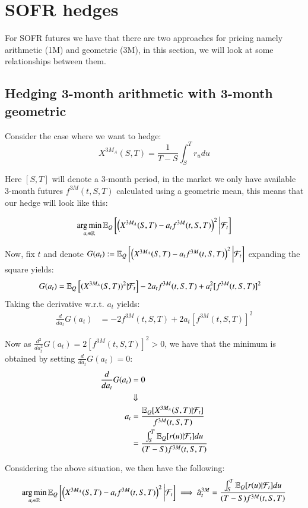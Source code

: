 \newpage 

\section{SOFR hedges}
For SOFR futures we have that there are two approaches for pricing namely arithmetic (1M) and geometric (3M), in this section, we will look at some relationships between them.


\subsection{Hedging 3-month arithmetic with 3-month geometric}
Consider the case where we want to hedge: 
$$
X^{3M_{A}}(S,T) = \frac{1}{T-S}\int_{S}^{T}r_{u}du
$$

Here $[S,T]$ will denote a 3-month period, in the market we only have available
3-month futures $f^{3M}(t,S,T)$  calculated using a geometric mean, this means that our hedge will look like this:

\begin{align*}
\operatorname*{arg\,min}\limits_{a_{t} \in \mathbb{R}}\mathbb{E}_{Q}\left[
\left(
X^{3M_{A}}(S,T)-a_{t}f^{3M}(t,S,T)
\right)^{2}
\bigg{|}\mathcal{F}_{t}
\right]
\end{align*}

Now, fix $t$ and denote
 $G(a_{t}) :=\mathbb{E}_{Q}\left[
\left(X^{3M_{A}}(S,T)-a_{t}f^{3M}(t,S,T)
\right)^{2}
\bigg{|}\mathcal{F}_{t}
\right]
$ 
expanding the square yields:
\begin{align*}
G(a_{t}) &= \mathbb{E}_{Q}\left[(X^{3M_{A}}(S,T))^{2}|\mathcal{F}_{t}\right] -2a_{t}f^{3M}(t,S,T) +
a_{t}^{2}[f^{3M}(t,S,T)]^{2}
\end{align*}
Taking the derivative w.r.t. $a_{t}$ yields: 
\begin{align*}
\frac{d}{da_{t}}G(a_{t}) &= -2f^{3M}(t,S,T) + 2a_{t}[f^{3M}(t,S,T)]^{2}  
\end{align*} 

Now as $\frac{d^{2}}{da_{t}^{2}}G(a_{t}) = 2[f^{3M}(t,S,T)]^{2} > 0$, we have that the minimum is obtained by setting $\frac{d}{da_{t}}G(a_{t}) = 0$:
\begin{align*}
\frac{d}{da_{t}}G(a_{t}) &= 0 \\ 
&\Downarrow \\ 
a_{t} &= \frac{
\mathbb{E}_{Q}[X^{3M_{A}}(S,T)|\mathcal{F}_{t}]
}{
f^{3M}(t,S,T)
} \\ 
&= \frac{
\int_{S}^{T}\mathbb{E}_{Q}[r(u)|\mathcal{F}_{t}]du
}{
(T-S)f^{3M}(t,S,T)
}
\end{align*}

\begin{result}
\label{result: optimal_SOFR_hedge_3MA_vs_3GM}
Considering the above situation, we then have the following:
\begin{align*}
\operatorname*{arg\,min}\limits_{a_{t} \in \mathbb{R}}\mathbb{E}_{Q}\left[
\left(
X^{3M_{A}}(S,T)-a_{t}f^{3M}(t,S,T)
\right)^{2}
\bigg{|}\mathcal{F}_{t}
\right] 
\implies
\hat{a}_{t}^{3M} = \frac{
\int_{S}^{T}\mathbb{E}_{Q}[r(u)|\mathcal{F}_{t}]du
}{
(T-S)f^{3M}(t,S,T)
}
\end{align*}
\end{result} 

